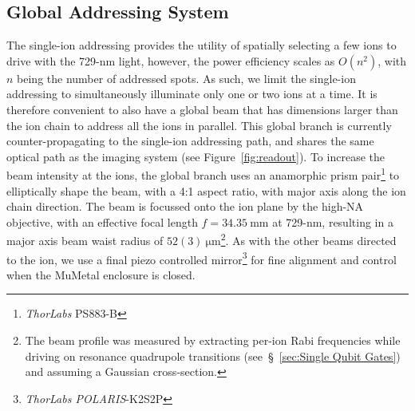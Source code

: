 \subsection{Global Addressing System}
\label{sec:Global Addressing System}
The single-ion addressing provides the utility of spatially selecting a few ions to
drive with the 729-nm light, however, the power efficiency scales as $O(n^2)$,
with $n$ being the number of addressed spots. As such, we limit the single-ion addressing to simultaneously illuminate only one or two ions at a time. It is therefore convenient to also
have a global beam that has dimensions larger than the ion chain to address all the ions in parallel. This global branch is currently counter-propagating to the single-ion addressing path, and shares the same optical path as the imaging system (see Figure~\ref{fig:readout}). To increase
the beam intensity at the ions, the global branch uses an anamorphic prism
pair\footnote{\emph{ThorLabs} PS883-B} to elliptically shape the beam, with a
4:1 aspect ratio, with major axis along the ion chain direction.  The beam is focussed onto the ion plane by the high-NA objective, 
with an effective focal length $f=34.35~\unit{\milli\meter}$ at 729-nm, resulting
in a major axis beam waist radius of $52(3)~\unit{\micro\meter}$\footnote{The
beam profile was measured by extracting per-ion Rabi frequencies while driving
on resonance quadrupole transitions (see~\S~\ref{sec:Single Qubit Gates}) and
assuming a Gaussian
cross-section.}. As with the other beams directed to the ion, we use a final piezo controlled mirror\footnote{\emph{ThorLabs POLARIS}-K2S2P} for fine alignment and control when the MuMetal enclosure is closed.


